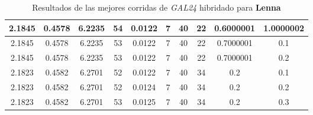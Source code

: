 \begin{table}[h!]
\begin{center}
\begin{tabular}{|c|c|c|c|c|c|c|c|c|c|}
        \hline
        \hline
            2.1845 & 0.4578  & 6.2235 & 54 & 0.0122 & 7 & 40 & 22 & 0.6000001 & 1.0000002\\
        \hline
        \hline
            2.1845 & 0.4578  & 6.2235 & 53 & 0.0122 & 7 & 40 & 22 & 0.7000001 & 0.1\\
        \hline
        \hline
            2.1845 & 0.4578  & 6.2235 & 53 & 0.0122 & 7 & 40 & 22 & 0.7000001 & 0.2\\
        \hline
        \hline
            2.1823 & 0.4582  & 6.2701 & 52 & 0.0122 & 7 & 40 & 34 & 0.2 & 0.1\\
        \hline
        \hline
            2.1823 & 0.4582  & 6.2701 & 52 & 0.0124 & 7 & 40 & 34 & 0.2 & 0.2\\
        \hline
        \hline
            2.1823 & 0.4582  & 6.2701 & 53 & 0.0125 & 7 & 40 & 34 & 0.2 & 0.3\\
        \hline
        \end{tabular}
        \caption{Resultados de las mejores corridas de \emph{GAL24} hibridado para {\bf Lenna}}
        \label{tb:tableGAL24}
    \end{center}
\end{table}
